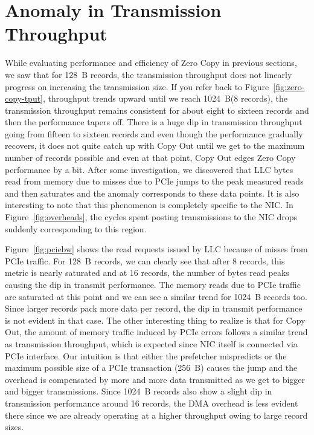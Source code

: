 \section{Anomaly in Transmission Throughput}
\label{sec:anomaly}
While evaluating performance and efficiency of Zero Copy in previous sections, we saw that for 128~B records, the transmission throughput does not linearly progress 
on increasing the transmission size. If you refer back to Figure~\ref{fig:zero-copy-tput}, throughput trends upward until we reach 1024~B(8 records), the transmission throughput remains consistent for about eight to sixteen records and 
then the performance tapers off. There is a huge dip in transmission throughput going from fifteen to sixteen records and even though the performance gradually recovers, it does not quite 
catch up with Copy Out until we get to the maximum number of records possible and even at that point, Copy Out edges Zero Copy performance by a bit. After some investigation, we discovered 
that LLC bytes read from memory due to misses due to PCIe jumps to the peak measured reads and then saturates and the anomaly corresponds to these data points. It is also interesting to note 
that this phenomenon is completely specific to the NIC. In Figure~\ref{fig:overheads}, the cycles spent posting transmissions to the NIC drops suddenly corresponding to this region.

Figure~\ref{fig:pciebw} shows the read requests issued by LLC because of misses from PCIe traffic. For 128~B records, we can clearly see that after 8 records, this metric is 
nearly saturated and at 16 records, the number of bytes read peaks causing the dip in transmit performance. The memory reads due to PCIe traffic are saturated at this point and 
we can see a similar trend for 1024~B records too. Since larger records pack more data per record, the dip in transmit performance is not evident in that case. The other interesting 
thing to realize is that for Copy Out, the amount of memory traffic induced by PCIe errors follows a similar trend as transmission throughput, which is expected since 
NIC itself is connected via PCIe interface. Our intuition is that either the prefetcher mispredicts or the maximum possible size of a PCIe transaction (256~B) causes the jump 
and the overhead is compensated by more and more data transmitted as we get to bigger and bigger transmissions. Since 1024~B records also show a slight dip in transmission performance 
around 16 records, the DMA overhead is less evident there since we are already operating at a higher throughput owing to large record sizes.


